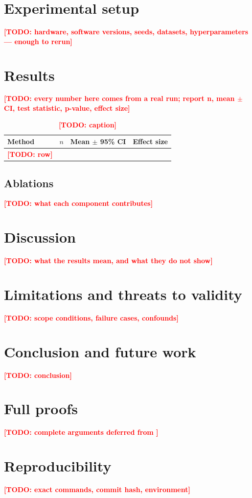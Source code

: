 \documentclass[11pt,a4paper]{article}
\theoremstyle{plain}
\theoremstyle{definition}
\theoremstyle{remark}
\newcommand{\TODO}[1]{\textcolor{red}{\textbf{[TODO: #1]}}}
\begin{document}
\section{Experimental setup}
\label{sec:setup}
\TODO{hardware, software versions, seeds, datasets, hyperparameters — enough to rerun}

\section{Results}
\label{sec:results}
\TODO{every number here comes from a real run; report n, mean $\pm$ CI, test statistic, p-value, effect size}

\begin{table}[t]
  \centering
  \caption{\TODO{caption}}
  \label{tab:results}
  \begin{tabular}{lccc}
    \toprule
    Method & $n$ & Mean $\pm$ 95\% CI & Effect size \\
    \midrule
    \TODO{row} & & & \\
    \bottomrule
  \end{tabular}
\end{table}

\subsection{Ablations}
\label{sec:ablations}
\TODO{what each component contributes}

\section{Discussion}
\label{sec:discussion}
\TODO{what the results mean, and what they do not show}

\section{Limitations and threats to validity}
\label{sec:limitations}
\TODO{scope conditions, failure cases, confounds}

\section{Conclusion and future work}
\label{sec:conclusion}
\TODO{conclusion}

\appendix

\section{Full proofs}
\label{app:proofs}
\TODO{complete arguments deferred from }

\section{Reproducibility}
\label{app:repro}
\TODO{exact commands, commit hash, environment}
\end{document}
